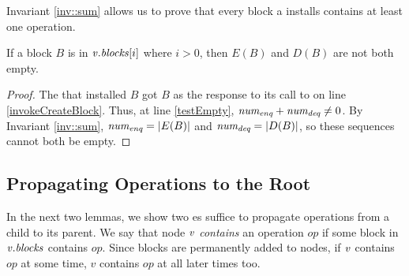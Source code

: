 Invariant \ref{inv::sum} allows us to prove that every block a  installs contains at least one operation.

\begin{corollary}\label{blockNotEmpty}
If a block $B$ is in $\mbox{\textnormal{\textit{v}}}.\mbox{\textit{blocks}}[i]$ where $i>0$, then $E(B)$ and $D(B)$ are not both empty.
\end{corollary}
\begin{proof}
The  that installed $B$ got $B$ as the response to its call to  on line \ref{invokeCreateBlock}.
Thus, at line \ref{testEmpty}, $\mbox{\textnormal{\textit{num\textsubscript{enq}}}}+\mbox{\textnormal{\textit{num\textsubscript{deq}}}}\neq 0$.
By Invariant \ref{inv::sum}, $\mbox{\textnormal{\textit{num\textsubscript{enq}}}} = |E(B)|$ and $\mbox{\textnormal{\textit{num\textsubscript{deq}}}} = |D(B)|$,
so these sequences cannot both be empty.
\end{proof}



\subsection{Propagating Operations to the Root}
\label{sec::propagating}

In the next two lemmas, we show two es suffice to propagate operations from a child to its parent.
We say that node $\mbox{\textnormal{\textit{v}}}$ \emph{contains} an operation $op$ if some block in $\mbox{\textnormal{\textit{v}}}.\mbox{\textit{blocks}}$ contains $op$.
Since blocks are permanently added to nodes, if $\mbox{\textnormal{\textit{v}}}$ contains $op$ at some time, $v$ contains $op$ at all later times too.

